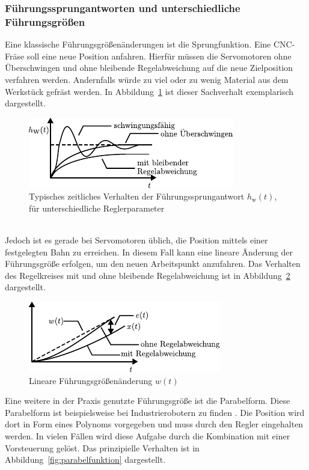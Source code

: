 \subsubsection{Führungssprungantworten und unterschiedliche Führungsgrößen}
%
Eine klassische Führungsgrößenänderungen ist die Sprungfunktion. Eine CNC-Fräse soll eine neue Position anfahren. Hierfür müssen die Servomotoren ohne Überschwingen und ohne bleibende Regelabweichung auf die neue Zielposition verfahren werden. Andernfalls würde zu viel oder zu wenig Material aus dem Werkstück gefräst werden. In Abbildung~\ref{fig:sprungantwort} ist dieser Sachverhalt exemplarisch dargestellt.
%
\begin{figure}[h]
	\centering
	\includegraphics[width=0.65\linewidth]{Abbildungen/Grundbegriffe/PDF/Fuehrungssprung.pdf}
	\caption{Typisches zeitliches Verhalten der Führungssprungantwort $h_{\text{w}}(t)$, für unterschiedliche Reglerparameter}
	\label{fig:sprungantwort}
\end{figure}\\
%
Jedoch ist es gerade bei Servomotoren üblich, die Position mittels einer festgelegten Bahn zu erreichen. In diesem Fall kann eine lineare Änderung der Führungsgröße erfolgen, um den neuen Arbeitspunkt anzufahren. Das Verhalten des Regelkreises mit und ohne bleibende Regelabweichung ist in Abbildung~\ref{fig:anstiegsfunktion} dargestellt.
%
\begin{figure}[h]
	\centering
	\includegraphics[width=0.65\linewidth]{Abbildungen/Grundbegriffe/PDF/Anstiegsfunktion.pdf}
	\caption{Lineare Führungsgrößenänderung $w(t)$}
	\label{fig:anstiegsfunktion}
\end{figure}
%
Eine weitere in der Praxis genutzte Führungsgröße ist die Parabelform. Diese Parabelform ist beispielsweise bei Industrierobotern zu finden \cite{Lunze10}. Die Position wird dort in Form eines Polynoms vorgegeben und muss durch den Regler eingehalten werden. In vielen Fällen wird diese Aufgabe durch die Kombination mit einer Vorsteuerung gelöst. Das prinzipielle Verhalten ist in Abbildung~\ref{fig:parabelfunktion} dargestellt.
